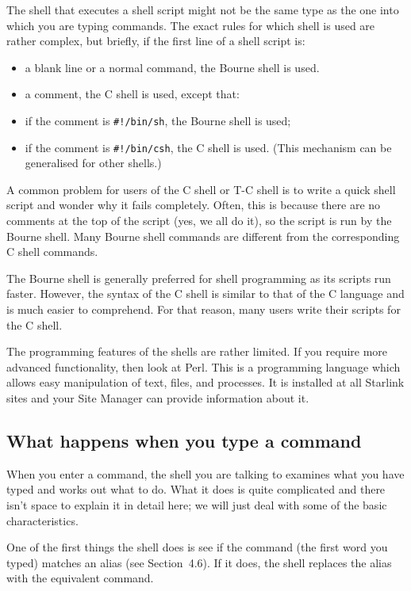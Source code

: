\documentclass[twoside,11pt]{article}
\newcommand{\htmlref}[2]{#1}
\begin{document}
The shell that executes a shell script might not be the same type as the one
into which you are typing commands.
The exact rules for which shell is used are rather complex, but briefly, if the
first line of a shell script is:
\begin{itemize}
\item a blank line or a normal command, the Bourne shell is used.
\item a comment, the C shell is used, except that:
\item if the comment is {\tt \#!/bin/sh}, the Bourne shell is used;
\item if the comment is {\tt \#!/bin/csh}, the C shell is used.\newline
(This mechanism can be generalised for other shells.)
\end{itemize}
A common problem for users of the C shell or T-C shell is to write a quick
shell script and wonder why it fails completely.
Often, this is because there are no comments at the top of the script (yes,
we all do it), so the script is run by the Bourne shell.
Many Bourne shell commands are different from the corresponding C shell
commands.

The Bourne shell is generally preferred for shell programming as 
its scripts run faster. However, the syntax of the C shell
is similar to that of the C language and is much easier to comprehend.
For that reason, many users write their scripts for the C shell.

The programming features of the shells are rather limited. If you require
more advanced functionality, then look at Perl. This is a programming
language which allows easy manipulation of text, files, and processes.
It is installed at all Starlink sites and your Site Manager can provide
information about it.

\subsection{What happens when you type a command}

When you enter a command, the shell you are talking to examines what you have
typed and works out what to do.
What it does is quite complicated and there isn't space to explain it in detail
here; we will just deal with some of the basic characteristics.

One of the first things the shell does is see if the command (the first word
you typed) matches an alias (see \htmlref{Section~4.6}{alias}).
If it does, the shell replaces the alias with the equivalent command.
\end{document}

